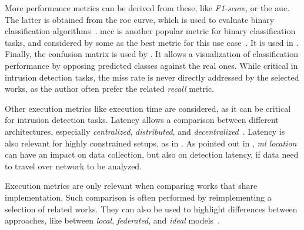 More performance metrics can be derived from these, like \emph{F1-score}, or the \gls{auc}.
The latter is obtained from the \gls{roc} curve, which is used to evaluate binary classification algorithms~\cite{pahl_AllEyesYou_2018,rathore_BlockSecIoTNetBlockchainbaseddecentralized_2019,nguyen_DIoTFederatedSelflearning_2019}.
\Gls{mcc} is another popular metric for binary classification tasks, and considered by some as the best metric for this use case~\cite{Chicco2020}.
It is used in \cite{rathore_BlockSecIoTNetBlockchainbaseddecentralized_2019}.
Finally, the confusion matrix is used by \cite{zhao_MultiTaskNetworkAnomaly_2019,al-athbaal-marri_FederatedMimicLearning_2020,chen_Networkanomalydetection_2020b,Sun2021}.
It allows a visualization of classification performance by opposing predicted classes against the real ones.
While critical in intrusion detection tasks, the miss rate is never directly addressed by the selected works, as the author often prefer the related \emph{recall} metric.

Other execution metrics like execution time are considered, as it can be critical for intrusion detection tasks.
Latency allows a comparison between different architectures, especially \emph{centralized}, \emph{distributed}, and \emph{decentralized}~\cite{rathore_BlockSecIoTNetBlockchainbaseddecentralized_2019}.
Latency is also relevant for highly constrained setups, as in \cite{qin_LineSpeedScalableIntrusion_2020a}.
As pointed out in , \emph{\gls{ml} location} can have an impact on data collection, but also on detection latency, if data need to travel over network to be analyzed.

Execution metrics are only relevant when comparing works that share implementation.
Such comparison is often performed by reimplementing a selection of related works.
They can also be used to highlight differences between approaches, like between \emph{local}, \emph{federated}, and \emph{ideal} models~\cite{li_DeepFedFederatedDeep_2020,rathore_BlockSecIoTNetBlockchainbaseddecentralized_2019}.